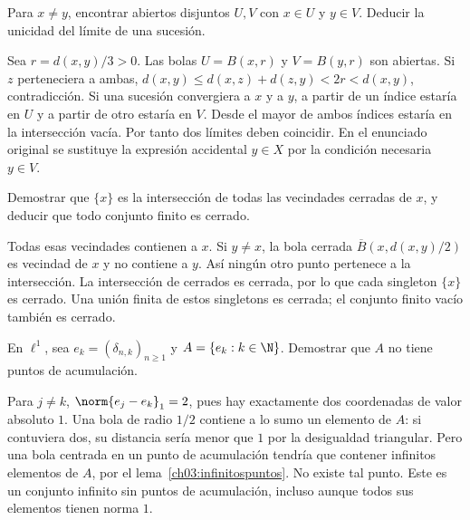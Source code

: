 \begin{ejercicio}\label{ej:lectura-3-3}
Para $x\ne y$, encontrar abiertos disjuntos $U,V$ con $x\in U$ y $y\in V$. Deducir la unicidad del límite de una sucesión.
\end{ejercicio}
\begin{solucion}
Sea $r=d(x,y)/3>0$. Las bolas $U=B(x,r)$ y $V=B(y,r)$ son abiertas. Si $z$ perteneciera a ambas, $d(x,y)\le d(x,z)+d(z,y)<2r<d(x,y)$, contradicción. Si una sucesión convergiera a $x$ y a $y$, a partir de un índice estaría en $U$ y a partir de otro estaría en $V$. Desde el mayor de ambos índices estaría en la intersección vacía. Por tanto dos límites deben coincidir. En el enunciado original se sustituye la expresión accidental $y\in X$ por la condición necesaria $y\in V$.
\end{solucion}

\begin{ejercicio}\label{ej:lectura-3-4}
Demostrar que $\{x\}$ es la intersección de todas las vecindades cerradas de $x$, y deducir que todo conjunto finito es cerrado.
\end{ejercicio}
\begin{solucion}
Todas esas vecindades contienen a $x$. Si $y\ne x$, la bola cerrada $\overline B(x,d(x,y)/2)$ es vecindad de $x$ y no contiene a $y$. Así ningún otro punto pertenece a la intersección. La intersección de cerrados es cerrada, por lo que cada singleton $\{x\}$ es cerrado. Una unión finita de estos singletons es cerrada; el conjunto finito vacío también es cerrado.
\end{solucion}

\begin{ejercicio}\label{ej:lectura-3-5}
En $\ell^1$, sea $e_k=(\delta_{n,k})_{n\ge1}$ y $A=\{e_k:k\in\N\}$. Demostrar que $A$ no tiene puntos de acumulación.
\end{ejercicio}
\begin{solucion}
Para $j\ne k$, $\norm{e_j-e_k}_1=2$, pues hay exactamente dos coordenadas de valor absoluto $1$. Una bola de radio $1/2$ contiene a lo sumo un elemento de $A$: si contuviera dos, su distancia sería menor que $1$ por la desigualdad triangular. Pero una bola centrada en un punto de acumulación tendría que contener infinitos elementos de $A$, por el lema~\ref{ch03:infinitospuntos}. No existe tal punto. Este es un conjunto infinito sin puntos de acumulación, incluso aunque todos sus elementos tienen norma $1$.
\end{solucion}

